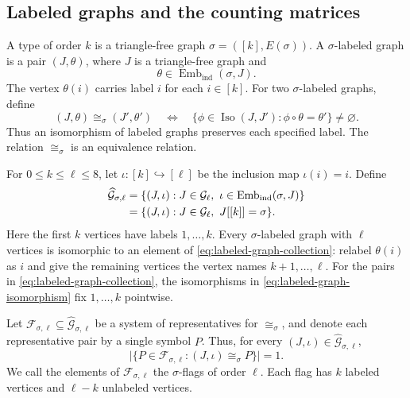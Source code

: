 \subsection{Labeled graphs and the counting matrices}
\label{subsec:labeled-graphs-and-counts}

A type of order $k$ is a triangle-free graph
$\sigma=([k],E(\sigma))$.
A $\sigma$-labeled graph is a pair $(J,\theta)$, where $J$ is a
triangle-free graph and
\[
\theta\in\operatorname{Emb}_{\mathrm{ind}}(\sigma,J).
\]
The vertex $\theta(i)$ carries label $i$ for each $i\in[k]$.
For two $\sigma$-labeled graphs, define
\begin{equation}\label{eq:labeled-graph-isomorphism}
(J,\theta)\cong_\sigma(J',\theta')
\quad\Longleftrightarrow\quad
\{\phi\in\operatorname{Iso}(J,J'):
\phi\circ\theta=\theta'\}\ne\varnothing.
\end{equation}
Thus an isomorphism of labeled graphs preserves each specified label.
The relation $\cong_\sigma$ is an equivalence relation.

For $0\leq k\leq\ell\leq8$, let
$\iota:[k]\hookrightarrow[\ell]$ be the inclusion map $\iota(i)=i$.
Define
\begin{align}
\widehat{\mathcal G}_{\sigma,\ell}
&=\{(J,\iota):J\in\mathcal G_\ell,
  \ \iota\in\operatorname{Emb}_{\mathrm{ind}}(\sigma,J)\}\notag\\
&=\{(J,\iota):J\in\mathcal G_\ell,\ J[[k]]=\sigma\}.
\label{eq:labeled-graph-collection}
\end{align}
Here the first $k$ vertices have labels $1,\ldots,k$.
Every $\sigma$-labeled graph with $\ell$ vertices is isomorphic to an
element of \eqref{eq:labeled-graph-collection}: relabel $\theta(i)$ as
$i$ and give the remaining vertices the vertex names $k+1,\ldots,\ell$.
For the pairs in \eqref{eq:labeled-graph-collection}, the isomorphisms
in \eqref{eq:labeled-graph-isomorphism} fix $1,\ldots,k$ pointwise.

Let $\mathcal F_{\sigma,\ell}\subseteq
\widehat{\mathcal G}_{\sigma,\ell}$ be a system of representatives
for $\cong_\sigma$, and denote each representative pair by a single
symbol $P$. Thus, for every
$(J,\iota)\in\widehat{\mathcal G}_{\sigma,\ell}$,
\begin{equation}\label{eq:labeled-flag-representatives}
\big|\{P\in\mathcal F_{\sigma,\ell}:
(J,\iota)\cong_\sigma P\}\big|=1.
\end{equation}
We call the elements of $\mathcal F_{\sigma,\ell}$ the
$\sigma$-flags of order $\ell$.
Each flag has $k$ labeled vertices and $\ell-k$ unlabeled vertices.

